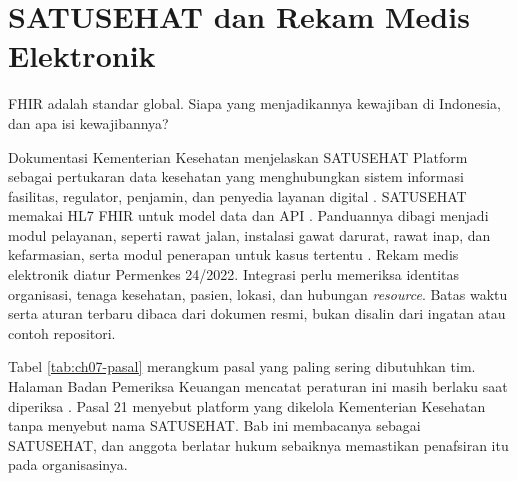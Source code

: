 \section{SATUSEHAT dan Rekam Medis Elektronik}

FHIR adalah standar global. Siapa yang menjadikannya kewajiban di Indonesia, dan apa isi kewajibannya?

Dokumentasi Kementerian Kesehatan menjelaskan SATUSEHAT Platform sebagai pertukaran data kesehatan yang menghubungkan
sistem informasi fasilitas, regulator, penjamin, dan penyedia layanan digital \cite{satusehat}. SATUSEHAT memakai HL7
FHIR untuk model data dan API \cite{c07-satusehat-fhir}. Panduannya dibagi menjadi modul pelayanan, seperti rawat
jalan, instalasi gawat darurat, rawat inap, dan kefarmasian, serta modul penerapan untuk kasus tertentu
\cite{satusehat}. Rekam medis elektronik diatur Permenkes 24/2022. Integrasi perlu memeriksa identitas organisasi,
tenaga kesehatan, pasien, lokasi, dan hubungan \textit{resource}. Batas waktu serta aturan terbaru dibaca dari dokumen
resmi, bukan disalin dari ingatan atau contoh repositori.

Tabel \ref{tab:ch07-pasal} merangkum pasal yang paling sering dibutuhkan tim. Halaman Badan Pemeriksa Keuangan
mencatat peraturan ini masih berlaku saat diperiksa \cite{permenkes24-2022}. Pasal 21 menyebut platform yang dikelola
Kementerian Kesehatan tanpa menyebut nama SATUSEHAT. Bab ini membacanya sebagai SATUSEHAT, dan anggota berlatar hukum
sebaiknya memastikan penafsiran itu pada organisasinya.

